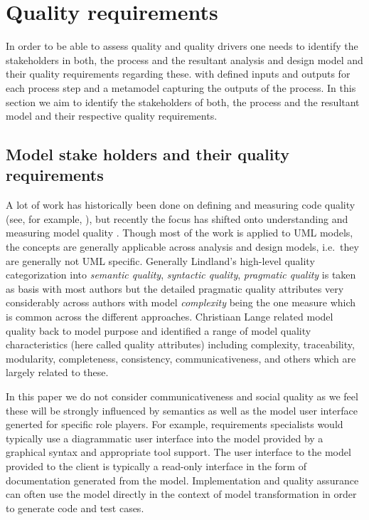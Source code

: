 \section{Quality requirements}


In order to be able to assess quality and quality drivers one needs to identify the stakeholders in both, the process and the resultant analysis and design model and their quality requirements regarding these.
with defined inputs and outputs for each process step and a metamodel capturing the outputs of the process. In this section we aim to identify the stakeholders of both, the process and the resultant model and their respective quality requirements.

\subsection{Model stake holders and their quality requirements}

A lot of work has historically been done on defining and measuring code quality (see, for example, \cite{boehm_barry_w._characteristics_1978}), but recently the focus has shifted onto understanding and measuring model quality \cite{lange_managing_2005,lange_improving_2006,shim_design_2008,qi_yu-dong_analysis_2010}. Though most of the work is applied to UML models, the concepts are generally applicable across analysis and design models, i.e.\ they are generally not UML specific. Generally Lindland's high-level quality categorization \cite{lindland_understanding_1994} into \emph{semantic quality}, \emph{syntactic quality}, \emph{pragmatic quality} is taken as basis with most authors but the detailed pragmatic quality attributes very considerably across authors with model \emph{complexity} being the one measure which is common across the different approaches. Christiaan Lange  \cite{lange_christiaan_assessing_2007} related model quality back to model purpose and identified a range of model quality characteristics (here called quality attributes) including complexity, traceability, modularity, completeness, consistency, communicativeness, and others which are largely related to these.

In this paper we do not consider communicativeness and social quality as we feel these will be strongly influenced by semantics as well as the model user interface generted for specific role players. For example, requirements specialists would typically use a diagrammatic user interface into the model provided by a graphical syntax and appropriate tool support. The user interface to the model provided to the client is typically a read-only interface in the form of documentation generated from the model. Implementation and quality assurance can often use the model directly in the context of model transformation in order to generate code and test cases.


